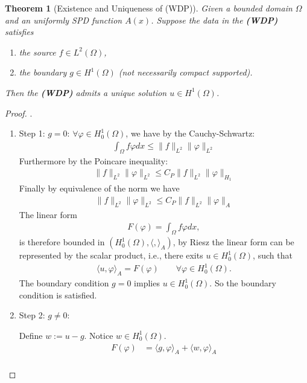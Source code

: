 \documentclass[a4paper,11pt,oneside,fleqn]{book}
\newtheorem{theorem}{Theorem}[section]
\theoremstyle{definition}
\theoremstyle{remark}
\begin{document}
\begin{theorem}[Existence and Uniqueness of (WDP)]
	 Given a bounded domain $\Omega$ and an uniformly SPD function $A(x)$. Suppose the data in the \textbf{(WDP)} satisfies 
	 \begin{enumerate}
	 	\item the source $f \in L^2(\Omega)$,
	 	\item the boundary $g \in H^1(\Omega)$ (not necessarily compact supported). 
	 \end{enumerate}
	  Then the \textbf{(WDP)}  admits a unique solution $u \in H^1(\Omega)$.
\end{theorem}
\begin{proof}.
\begin{enumerate}
	\item Step 1: $g = 0$: $\forall \varphi \in H^1_0(\Omega)$, we have by the Cauchy-Schwartz:
		\begin{align*}
		 	\int_\Omega f\varphi dx \leq \|f\|_{L^2} \|\varphi\|_{L^2} 
		 \end{align*}
		 Furthermore by the Poincare inequality:
		 \begin{align*}
		 	\|f\|_{L^2} \|\varphi\|_{L^2} \leq C_P \|f\|_{L^2} \|\varphi\|_{H_1}
		\end{align*}
		Finally by equivalence of the norm we have
		\begin{align*}
			\|f\|_{L^2} \|\varphi\|_{L^2} \leq C_P \|f\|_{L^2} \|\varphi\|_{A}
		\end{align*}
		The linear form 
		\begin{align*}
			F(\varphi) = \int_\Omega f \varphi dx,
		\end{align*}
		is therefore bounded in $(H^1_0(\Omega), \langle,\rangle_A)$, by Riesz the linear form can be represented by the scalar product, i.e., there exits $u \in H_0^1(\Omega)$, such that
		\begin{align*} 
		\langle u, \varphi \rangle_A = F(\varphi) \qquad \forall \varphi \in H^1_0(\Omega).	
		\end{align*}
		The boundary condition $g = 0$ implies $u \in H^1_0(\Omega)$. So the boundary condition is satisfied.
	\item Step 2: $g \neq 0$: \par 
	Define $w := u - g$. Notice $w \in H^1_0(\Omega)$. 
	\begin{align*}
		F(\varphi) &= \langle g,  \varphi \rangle_A + \langle w, \varphi \rangle_A
	\end{align*}
	\begin{align*}

\end{align*}
\end{enumerate}
\end{proof}
\end{document}
